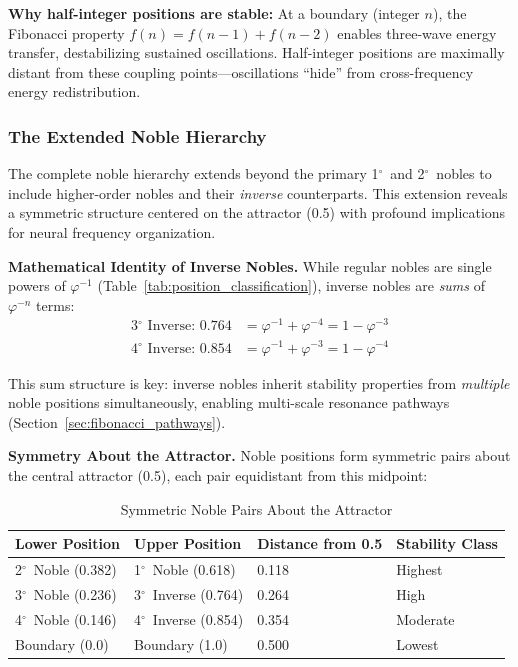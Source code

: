 \documentclass[11pt,a4paper]{article}
\newcommand{\degree}{$^\circ$}  %
\newcommand{\phisym}{\varphi}
\begin{document}
\textbf{Why half-integer positions are stable:} At a boundary (integer $n$), the Fibonacci property $f(n) = f(n-1) + f(n-2)$ enables three-wave energy transfer, destabilizing sustained oscillations. Half-integer positions are maximally distant from these coupling points---oscillations ``hide'' from cross-frequency energy redistribution.

\subsubsection{The Extended Noble Hierarchy}
\label{sec:extended_noble}

The complete noble hierarchy extends beyond the primary 1\degree\ and 2\degree\ nobles to include higher-order nobles and their \textit{inverse} counterparts. This extension reveals a symmetric structure centered on the attractor (0.5) with profound implications for neural frequency organization.

\textbf{Mathematical Identity of Inverse Nobles.}
While regular nobles are single powers of $\phisym^{-1}$ (Table~\ref{tab:position_classification}), inverse nobles are \textit{sums} of $\phisym^{-n}$ terms:
\begin{align}
\text{3\degree\ Inverse: } 0.764 &= \phisym^{-1} + \phisym^{-4} = 1 - \phisym^{-3} \\
\text{4\degree\ Inverse: } 0.854 &= \phisym^{-1} + \phisym^{-3} = 1 - \phisym^{-4}
\end{align}

This sum structure is key: inverse nobles inherit stability properties from \textit{multiple} noble positions simultaneously, enabling multi-scale resonance pathways (Section~\ref{sec:fibonacci_pathways}).

\textbf{Symmetry About the Attractor.}
Noble positions form symmetric pairs about the central attractor (0.5), each pair equidistant from this midpoint:

\begin{table}[H]
\centering
\caption{Symmetric Noble Pairs About the Attractor}
\label{tab:symmetric_pairs}
\begin{tabular}{@{}llll@{}}
\toprule
Lower Position & Upper Position & Distance from 0.5 & Stability Class \\
\midrule
2\degree\ Noble (0.382) & 1\degree\ Noble (0.618) & 0.118 & Highest \\
3\degree\ Noble (0.236) & 3\degree\ Inverse (0.764) & 0.264 & High \\
4\degree\ Noble (0.146) & 4\degree\ Inverse (0.854) & 0.354 & Moderate \\
Boundary (0.0) & Boundary (1.0) & 0.500 & Lowest \\
\bottomrule
\end{tabular}
\end{table}
\end{document}
